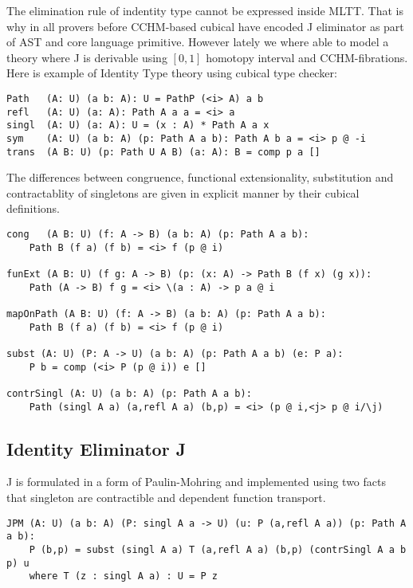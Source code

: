 \documentclass{aip-cp}
\begin{document}
The elimination rule of indentity type cannot be expressed inside MLTT. That is why in all provers
before CCHM-based cubical have encoded J eliminator as part of AST and core language primitive.
However lately we where able to model a theory where J is derivable using $[0,1]$
homotopy interval \cite{Mortberg17} and CCHM-fibrations. Here is example of Identity Type theory
using cubical type checker:

\begin{lstlisting}[mathescape=true]
Path   (A: U) (a b: A): U = PathP (<i> A) a b
refl   (A: U) (a: A): Path A a a = <i> a
singl  (A: U) (a: A): U = (x : A) * Path A a x
sym    (A: U) (a b: A) (p: Path A a b): Path A b a = <i> p @ -i
trans  (A B: U) (p: Path U A B) (a: A): B = comp p a []
\end{lstlisting}

The differences between congruence, functional extensionality,
substitution and contractablity of singletons are given in explicit manner
by their cubical definitions.

\begin{lstlisting}[mathescape=true]
cong   (A B: U) (f: A -> B) (a b: A) (p: Path A a b):
    Path B (f a) (f b) = <i> f (p @ i)

funExt (A B: U) (f g: A -> B) (p: (x: A) -> Path B (f x) (g x)):
    Path (A -> B) f g = <i> \(a : A) -> p a @ i

mapOnPath (A B: U) (f: A -> B) (a b: A) (p: Path A a b):
    Path B (f a) (f b) = <i> f (p @ i)

subst (A: U) (P: A -> U) (a b: A) (p: Path A a b) (e: P a):
    P b = comp (<i> P (p @ i)) e []

contrSingl (A: U) (a b: A) (p: Path A a b):
    Path (singl A a) (a,refl A a) (b,p) = <i> (p @ i,<j> p @ i/\j)
\end{lstlisting}

\subsection*{Identity Eliminator J}

J is formulated in a form of Paulin-Mohring and implemented
using two facts that singleton are contractible and dependent function transport.

\begin{lstlisting}[mathescape=true]
JPM (A: U) (a b: A) (P: singl A a -> U) (u: P (a,refl A a)) (p: Path A a b):
    P (b,p) = subst (singl A a) T (a,refl A a) (b,p) (contrSingl A a b p) u
    where T (z : singl A a) : U = P z
\end{lstlisting}
\end{document}
